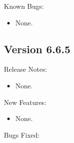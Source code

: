 \noindent Known Bugs:

\begin{itemize}

\item None.

\end{itemize}




\subsection{\label{sec:New-6-6-5}Version 6.6.5}

\noindent Release Notes:

\begin{itemize}

\item None.

\end{itemize}

\noindent New Features:

\begin{itemize}

\item None.

\end{itemize}

\noindent Bugs Fixed:

